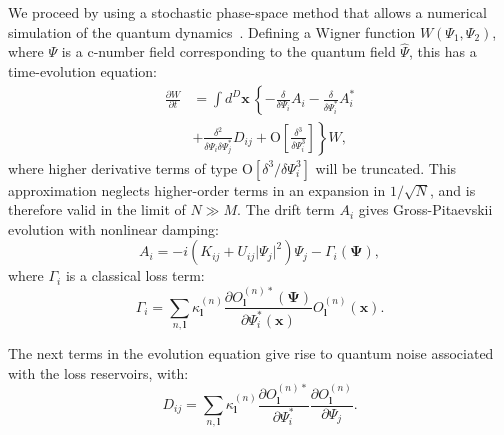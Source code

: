 \documentclass[aps,prl,twocolumn,showpacs,amsmath,amssymb,superscriptaddress,flushbottom,noraggedfooter]{revtex4-1}
\newcommand{\xvec}{\boldsymbol{x}}
\newcommand{\lvec}{\boldsymbol{l}}
\newcommand{\Psivec}{\boldsymbol{\Psi}}
\begin{document}
We proceed by using a stochastic phase-space method
that allows a numerical simulation of the quantum dynamics~\cite{Drummond1993,Steel1998,Hoffmann2008}.
Defining a Wigner function $W\left(\Psi_{1},\Psi_{2}\right)$,
where $\Psi$ is a c-number field corresponding to the quantum field $\hat{\Psi}$,
this has a time-evolution equation:
\begin{equation}
\begin{split}
	\frac{\partial W}{\partial t} & = \int d^D \xvec \,\left\{
		-\frac{\delta}{\delta\Psi_{i}} A_{i} -
		\frac{\delta}{\delta\Psi_{i}^*} A_{i}^* \right. \\
& + \left. \frac{\delta^{2}}{\delta\Psi_{i} \delta\Psi_{j}^{*}}D_{ij} +
		\mbox{O} \left[ \frac{\delta^{3}}{\delta\Psi_{i}^{3}} \right]
	\right\} W,
\end{split}
\end{equation}
where higher derivative terms of type $\mbox{O}\left[\delta^3/\delta\Psi_{i}^{3}\right]$
will be truncated.
This approximation neglects higher-order terms in an expansion in $1/\sqrt{N}$,
and is therefore valid in the limit of $N \gg M$.
The drift term $A_{i}$ gives Gross-Pitaevskii evolution with nonlinear damping:
\begin{equation}
	A_{i} = -i \left( K_{ij} + U_{ij} \lvert \Psi_{j} \rvert^{2} \right) \Psi_{j} -
	\Gamma_{i} \left( \Psivec \right),
\end{equation}
where $\Gamma_{i}$ is a classical loss term:
\begin{equation}
	\Gamma_{i} = \sum_{n,\lvec} \kappa_{\lvec}^{(n)}
	\frac{
		\partial O_{\lvec}^{(n)*} \left( \Psivec \right)
	}{
		\partial \Psi_{i}^* \left( \xvec \right)
	}
	O_{\lvec}^{(n)} \left( \xvec \right).
\end{equation}

The next terms in the evolution equation give rise to
quantum noise associated with the loss reservoirs,
with:
\begin{equation}
	D_{ij} = \sum_{n,\lvec} \kappa_{\lvec}^{(n)}
	\frac{\partial O_{\lvec}^{(n)*}}{\partial\Psi_{i}^{*}}
	\frac{\partial O_{\lvec}^{(n)}}{\partial\Psi_{j}}.
\end{equation}
\end{document}
